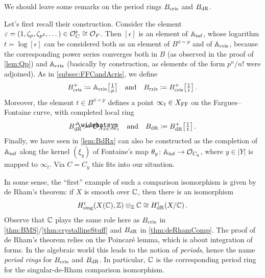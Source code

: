 \documentclass[a4paper, 10pt, oneside, DIV=9, chapterprefix=true, numbers=enddot,bibliography=totoc]{scrbook}
\begin{document}
\begin{rem}\label{rem:periodRings}
	We should leave some remarks on the period rings $B_{\mathrm{cris}}$ and $B_{\mathrm{dR}}$.
	\begin{numerate}
		\item Let's first recall their construction. Consider the element $\varepsilon=(1,\zeta_p,\zeta_{p^2},\dotsc)\in \mathcal{O}_C^\flat\cong \mathcal{O}_F$. Then $[\epsilon]$ is an element of $\mathbb{A}_{\mathrm{inf}}$, whose logarithm $t=\log{[\epsilon]}$ can be considered both as an element of $B^{\phi=p}$ and of $\mathbb{A}_{\mathrm{cris}}$, because the corresponding power series converges both in $B$ (as observed in the proof of \cref{lem:Qp}) and $\mathbb{A}_{\mathrm{cris}}$ (basically by construction, as elements of the form $p^n/n!$ were adjoined). As in \cref{subsec:FFCandAcris}, we define
		\begin{equation*}
			B_{\mathrm{cris}}^+\coloneqq \mathbb{A}_{\mathrm{cris}}\big[\textstyle\frac{1}{p}\big]\quad\text{and}\quad B_{\mathrm{cris}}\coloneqq B_{\mathrm{cris}}^+\big[\textstyle\frac{1}{t}\big]\,.
		\end{equation*}
		Moreover, the element $t\in B^{\phi=p}$ defines a point $\infty_t\in X_{\mathrm{FF}}$ on the Fargues--Fontaine curve, with completed local ring
		\begin{equation*}
			B_\dR^+\coloneqq \roof{\Oo}_{X_\FFC,\infty_t}\quad\text{and}\quad B_\dR\coloneqq B_\dR^+\localize{t}\,.
		\end{equation*}
		Finally, we have seen in \cref{lem:BdRx} can also be constructed as the completion of $\mathbb{A}_{\mathrm{inf}}$ along the kernel $(\xi_y)$ of Fontaine's map $\theta_y\colon \IA_\inf\morphism \Oo_{C_y}$, where $y\in |Y|$ is mapped to $\infty_t$. Via $C=C_y$ this fits into our situation.
		\item In some sense, the \enquote{first} example of such a comparison isomorphism is given by de Rham's theorem: if $X$ is smooth over $\mathbb{C}$, then there is an isomorphism 
		\begin{equation*}
			H_\mathrm{sing}^i(X(\mathbb{C}),\mathbb{Z})\otimes_{\mathbb{Z}}\mathbb{C}\cong H_{\mathrm{dR}}^i(X/\mathbb{C})\,.
		\end{equation*}
		Observe that $\mathbb{C}$ plays the same role here as $B_{\mathrm{cris}}$ in \cref{thm:BMS}/\cref{thm:crystallineStuff} and $B_{\mathrm{dR}}$ in \cref{thm:deRhamComp}. The proof of de Rham's theorem relies on the Poincaré lemma, which is about integration of forms. In the algebraic world this leads to the notion of \emph{periods}, hence the name \emph{period rings} for $B_{\mathrm{cris}}$ and $B_{\mathrm{dR}}$. In particular, $\mathbb{C}$ is the corresponding period ring for the singular-de-Rham comparison isomorphism.
	\end{numerate}
\end{rem}
\end{document}
